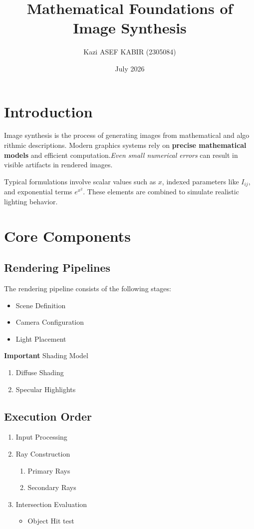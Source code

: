 \documentclass{article}
\title{Mathematical Foundations of Image Synthesis}
\author{ Kazi ASEF KABIR (2305084)}
\date{July 2026}
\begin{document}
\maketitle

\section{Introduction}
Image synthesis is the process of generating images from mathematical and algo
rithmic descriptions. Modern graphics systems rely on \textbf{precise mathematical
models} and efficient computation.\textit{Even small numerical errors} can result in
visible artifacts in rendered images.

Typical formulations involve scalar values such as $x$, indexed parameters
like $I_{ij}$, and exponential terms $e^{x^2}$. These elements are combined to simulate
realistic lighting behavior.

\section{Core Components}
\subsection{Rendering Pipelines}
The rendering pipeline consists of the following stages:
\begin{itemize}
    \item Scene Definition
    \item Camera Configuration
    \item[-] Light Placement
\end{itemize}
\textbf{Important} Shading Model
\begin{enumerate}
    \item[-] Diffuse Shading
    \item[-] Specular Highlights
\end{enumerate}
\subsection{Execution Order}
\begin{enumerate}
    \item Input Processing
    \item Ray Construction
            \begin{enumerate}
                \item Primary Rays
                \item Secondary Rays
            \end{enumerate}
    \item Intersection Evaluation
            \begin{itemize}
                \item Object Hit test
            \end{itemize}
\end{enumerate}
\end{document}
